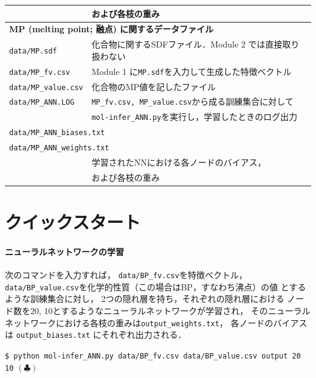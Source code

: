 \documentclass[11pt,dvipdfmx,twoside]{jarticle}
\begin{document}
\begin{table}[t!]
\begin{tabular}{lcll}
  &&\multicolumn{2}{l}{および各枝の重み}\\
  \hline
  \multicolumn{4}{l}{\bf MP (melting point; 融点) に関するデータファイル}\\
  \multicolumn{2}{l}{\tt data/MP.sdf} & \multicolumn{2}{l}{化合物に関するSDFファイル．Module 2 では直接取り扱わない}\\
  \multicolumn{2}{l}{\tt data/MP\_fv.csv} & \multicolumn{2}{l}{Module 1 に{\tt MP.sdf}を入力して生成した特徴ベクトル}\\
  \multicolumn{2}{l}{\tt data/MP\_value.csv} & \multicolumn{2}{l}{化合物のMP値を記したファイル}\\
  \multicolumn{2}{l}{\tt data/MP\_ANN.LOG} & \multicolumn{2}{l}{{\tt MP\_fv.csv, MP\_value.csv}から成る訓練集合に対して}\\
  &&\multicolumn{2}{l}{{\tt mol-infer\_ANN.py}を実行し，学習したときのログ出力}\\
  \multicolumn{4}{l}{\tt data/MP\_ANN\_biases.txt} \\
  \multicolumn{4}{l}{\tt data/MP\_ANN\_weights.txt} \\
  &&\multicolumn{2}{l}{学習されたNNにおける各ノードのバイアス，}\\
  &&\multicolumn{2}{l}{および各枝の重み}\\
  \hline
  \end{tabular}

\end{table}


\clearpage
\section{クイックスタート}
\label{sec:quick}

\paragraph{ニューラルネットワークの学習}

次のコマンドを入力すれば，
\verb|data/BP_fv.csv|を特徴ベクトル，
\verb|data/BP_value.csv|を化学的性質（この場合はBP，すなわち沸点）の値
とするような訓練集合に対し，
2つの隠れ層を持ち，それぞれの隠れ層における
ノード数を20, 10とするようなニューラルネットワークが学習され，
そのニューラルネットワークにおける各枝の重みは\verb|output_weights.txt|，
各ノードのバイアスは
\verb|output_biases.txt|
にそれぞれ出力される．

\begin{oframed}
{\small
\verb|$ python mol-infer_ANN.py data/BP_fv.csv data/BP_value.csv output 20 10|
\hfill $(\clubsuit)$}
\end{oframed}
\end{document}
